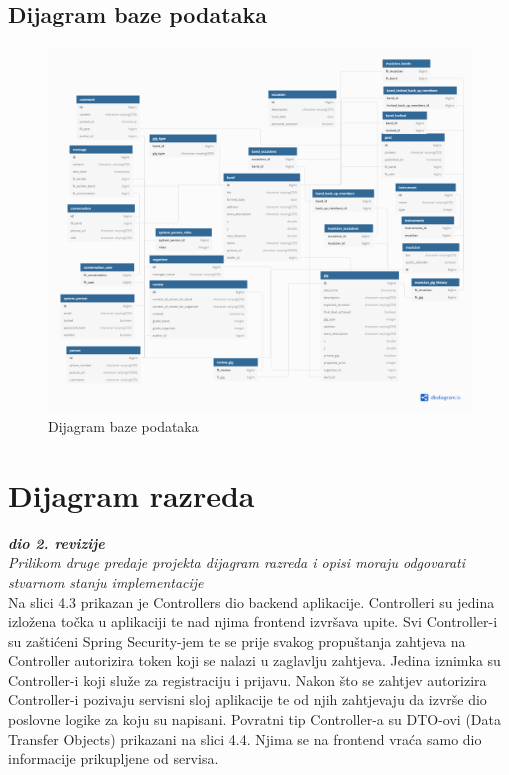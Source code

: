 		
	

			
			\subsection{Dijagram baze podataka}
			
			\begin{figure}[H]
			\begin{center}
				\includegraphics[width=17cm]{slike/ERModel.PNG}
			\end{center}
			\caption{Dijagram baze podataka}
			\label{fig:dijagramBaze}
		\end{figure}
			
			
			
		\section{Dijagram razreda}


			\textit{\textbf{dio 2. revizije}} \\
			
			\textit{Prilikom druge predaje projekta dijagram razreda i opisi moraju odgovarati stvarnom stanju implementacije} \\
			
			
			Na slici 4.3 prikazan je Controllers dio backend aplikacije. Controlleri su jedina izložena točka u aplikaciji te nad njima frontend izvršava upite. Svi Controller-i su zaštićeni Spring Security-jem te se prije svakog propuštanja zahtjeva na Controller autorizira token koji se nalazi u zaglavlju zahtjeva. Jedina iznimka su Controller-i koji služe za registraciju i prijavu. Nakon što se zahtjev autorizira Controller-i pozivaju servisni sloj aplikacije te od njih zahtjevaju da izvrše dio poslovne logike za koju su napisani. Povratni tip Controller-a su DTO-ovi (Data Transfer Objects) prikazani na slici 4.4. Njima se na frontend vraća samo dio informacije prikupljene od servisa.  

